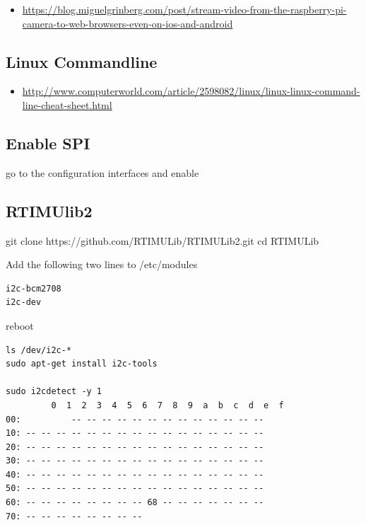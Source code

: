 \begin{itemize}
\tightlist
\item
  \url{https://blog.miguelgrinberg.com/post/stream-video-from-the-raspberry-pi-camera-to-web-browsers-even-on-ios-and-android}
\end{itemize}

\subsection{Linux Commandline}\label{linux-commandline}

\begin{itemize}
\tightlist
\item
  \url{http://www.computerworld.com/article/2598082/linux/linux-linux-command-line-cheat-sheet.html}
\end{itemize}

\subsection{Enable SPI}\label{enable-spi}

go to the configuration interfaces and enable

\subsection{RTIMUlib2}\label{rtimulib2}

git clone https://github.com/RTIMULib/RTIMULib2.git cd RTIMULib

Add the following two lines to /etc/modules

\begin{verbatim}
i2c-bcm2708
i2c-dev
\end{verbatim}

reboot

\begin{verbatim}
ls /dev/i2c-*
sudo apt-get install i2c-tools

sudo i2cdetect -y 1
         0  1  2  3  4  5  6  7  8  9  a  b  c  d  e  f
00:          -- -- -- -- -- -- -- -- -- -- -- -- -- 
10: -- -- -- -- -- -- -- -- -- -- -- -- -- -- -- -- 
20: -- -- -- -- -- -- -- -- -- -- -- -- -- -- -- -- 
30: -- -- -- -- -- -- -- -- -- -- -- -- -- -- -- -- 
40: -- -- -- -- -- -- -- -- -- -- -- -- -- -- -- -- 
50: -- -- -- -- -- -- -- -- -- -- -- -- -- -- -- -- 
60: -- -- -- -- -- -- -- -- 68 -- -- -- -- -- -- -- 
70: -- -- -- -- -- -- -- --
\end{verbatim}

